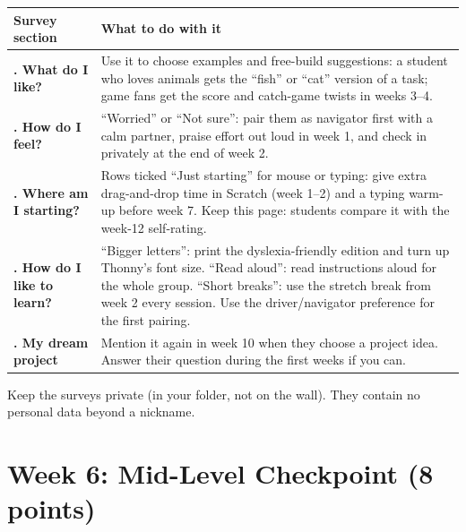 \begin{center}\small\renewcommand{\arraystretch}{1.35}
\begin{tabularx}{\linewidth}{@{}>{\bfseries\RaggedRight}p{3.4cm}X@{}}
\toprule
Survey section & What to do with it\\
\midrule
1. What do I like? & Use it to choose examples and free-build suggestions: a student who loves animals gets the \enquote{fish} or \enquote{cat} version of a task; game fans get the score and catch-game twists in weeks 3--4.\\
2. How do I feel? & \enquote{Worried} or \enquote{Not sure}: pair them as navigator first with a calm partner, praise effort out loud in week 1, and check in privately at the end of week 2.\\
3. Where am I starting? & Rows ticked \enquote{Just starting} for mouse or typing: give extra drag-and-drop time in Scratch (week 1--2) and a typing warm-up before week 7. Keep this page: students compare it with the week-12 self-rating.\\
4. How do I like to learn? & \enquote{Bigger letters}: print the dyslexia-friendly edition and turn up Thonny's font size. \enquote{Read aloud}: read instructions aloud for the whole group. \enquote{Short breaks}: use the stretch break from week 2 every session. Use the driver/navigator preference for the first pairing.\\
5. My dream project & Mention it again in week 10 when they choose a project idea. Answer their question during the first weeks if you can.\\
\bottomrule
\end{tabularx}
\end{center}
Keep the surveys private (in your folder, not on the wall). They contain no personal data beyond a nickname.

\section{Week 6: Mid-Level Checkpoint (8 points)}

